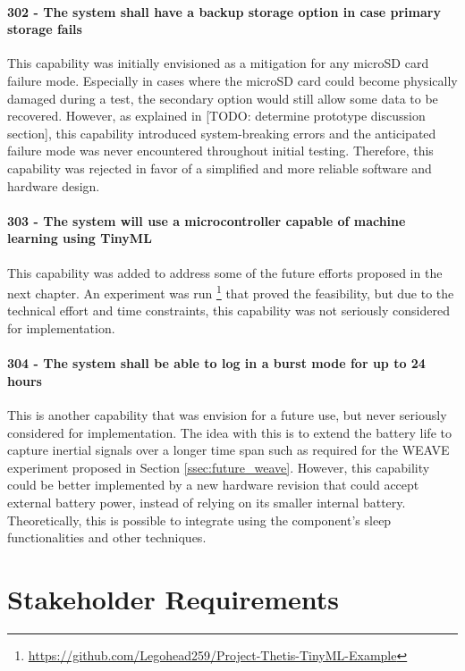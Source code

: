 \paragraph*{302 - The system shall have a backup storage option in case primary storage fails} This capability was initially envisioned as a mitigation for any microSD card failure mode.
Especially in cases where the microSD card could become physically damaged during a test, the secondary option would still allow some data to be recovered.
However, as explained in [TODO: determine prototype discussion section], this capability introduced system-breaking errors and the anticipated failure mode was never encountered throughout initial testing.
Therefore, this capability was rejected in favor of a simplified and more reliable software and hardware design.

\paragraph*{303 - The system will use a microcontroller capable of machine learning using TinyML} This capability was added to address some of the future efforts proposed in the next chapter.
An experiment was run \footnote{\url{https://github.com/Legohead259/Project-Thetis-TinyML-Example}} that proved the feasibility, but due to the technical effort and time constraints, this capability was not seriously considered for implementation.

\paragraph*{304 - The system shall be able to log in a burst mode for up to 24 hours} This is another capability that was envision for a future use, but never seriously considered for implementation.
The idea with this is to extend the battery life to capture inertial signals over a longer time span such as required for the WEAVE experiment proposed in Section \ref{ssec:future_weave}.
However, this capability could be better implemented by a new hardware revision that could accept external battery power, instead of relying on its smaller internal battery.
Theoretically, this is possible to integrate using the component's sleep functionalities and other techniques.

\section{Stakeholder Requirements}


